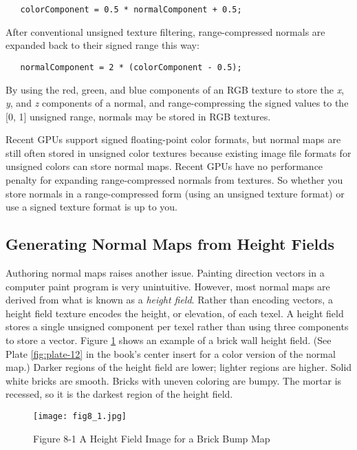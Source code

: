 \documentclass[../main.tex]{subfiles}
\begin{document}
\FloatBarrier
\begin{lstlisting}
   colorComponent = 0.5 * normalComponent + 0.5;
\end{lstlisting}
\FloatBarrier

After conventional unsigned texture filtering, range-compressed normals are expanded back to their signed range this way:

\FloatBarrier
\begin{lstlisting}
   normalComponent = 2 * (colorComponent - 0.5);
\end{lstlisting}
\FloatBarrier

By using the red, green, and blue components of an RGB texture to store the \textit{x}, \textit{y}, and \textit{z} components of a normal, and range-compressing the signed values to the [0, 1] unsigned range, normals may be stored in RGB textures.

Recent GPUs support signed floating-point color formats, but normal maps are still often stored in unsigned color textures because existing image file formats for unsigned colors can store normal maps. Recent GPUs have no performance penalty for expanding range-compressed normals from textures. So whether you store normals in a range-compressed form (using an unsigned texture format) or use a signed texture format is up to you.

\subsection*{Generating Normal Maps from Height Fields}

Authoring normal maps raises another issue. Painting direction vectors in a computer paint program is very unintuitive. However, most normal maps are derived from what is known as a \textit{height field}. Rather than encoding vectors, a height field texture encodes the height, or elevation, of each texel. A height field stores a single unsigned component per texel rather than using three components to store a vector. Figure \ref{fig:8-1} shows an example of a brick wall height field. (See Plate \ref{fig:plate-12} in the book's center insert for a color version of the normal map.) Darker regions of the height field are lower; lighter regions are higher. Solid white bricks are smooth. Bricks with uneven coloring are bumpy. The mortar is recessed, so it is the darkest region of the height field.

\begin{figure}
    \centering
    \texttt{[image: fig8\_1.jpg]}
    \caption{Figure 8-1 A Height Field Image for a Brick Bump Map}
    \label{fig:8-1}
\end{figure}
\end{document}
